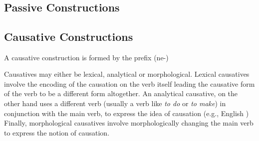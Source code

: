 \pex{}
\\
\\
\\
\\
\\
\\
\xe



\subsection{Passive Constructions}


\subsection{Causative Constructions}
A causative construction is formed by the prefix \ird(ne-)

Causatives may either be lexical, analytical or morphological. Lexical causatives involve the encoding of the causation on the verb itself leading the causative form of the verb to be a different form altogether. An analytical causative, on the other hand uses a different verb (usually a verb like \emph{to do} or \emph{to make}) in conjunction with the main verb, to express the idea of causation (e.g., English ) Finally, morphological causatives involve morphologically changing the main verb to express the notion of causation.

